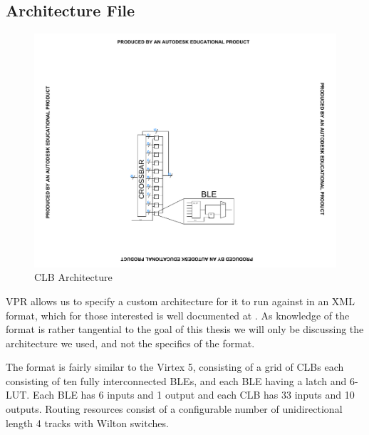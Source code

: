 \documentclass[12pt,drafta4paper,oneside]{memoir} %
\begin{document}
\subsection{Architecture File}
\begin{figure}
    \includegraphics[clip,trim=5cm 4cm 5cm 8cm]{images/CLB.pdf}
    \caption{CLB Architecture}
    \label{Arch}
\end{figure}
VPR allows us to specify a custom architecture for it to run against in an XML format, which for those interested is well documented at . As knowledge of the format is rather tangential to the goal of this thesis we will only be discussing the architecture we used, and not the specifics of the format.

The format is fairly similar to the Virtex 5, consisting of a grid of \acp{CLB} each consisting of ten fully interconnected \acp{BLE}, and each \ac{BLE} having a latch and 6-\ac{LUT}.
Each \ac{BLE} has 6 inputs and 1 output and each \ac{CLB} has 33 inputs and 10 outputs.
Routing resources consist of a configurable number of unidirectional length 4 tracks with \ac{Wilton} switches.

\end{document}

